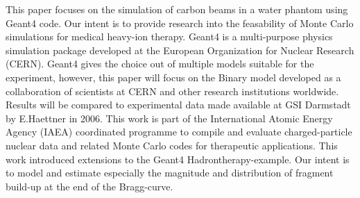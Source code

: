 \begin{abstractpage}[english]
This paper focuses on the simulation of carbon beams in a water phantom using Geant4 code. Our intent is to provide research into the feasability of Monte Carlo simulations for medical heavy-ion therapy. Geant4 is a multi-purpose physics simulation package developed at the European Organization for Nuclear Research (CERN). Geant4 gives the choice out of multiple models suitable for the experiment, however, this paper will focus on the Binary model developed as a collaboration of scientists at CERN and other research institutions worldwide. Results will be compared to experimental data made available at GSI Darmstadt by E.Haettner in 2006. This work is part of the International Atomic Energy Agency (IAEA) coordinated programme to compile and evaluate charged-particle nuclear data and related Monte Carlo codes for therapeutic applications. This work introduced extensions to the Geant4 Hadrontherapy-example. Our intent is to model and estimate especially the magnitude and distribution of fragment build-up at the end of the Bragg-curve.
\end{abstractpage}

\newpage



\tableofcontents


%


\cleardoublepage
\storeinipagenumber
{}
\setcounter{page}{1}


